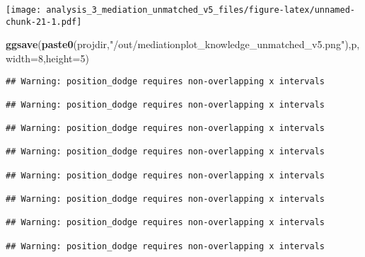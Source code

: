 \documentclass[
]{article}
\newenvironment{Shaded}{\begin{snugshade}}{\end{snugshade}}
\newcommand{\DataTypeTok}[1]{\textcolor[rgb]{0.13,0.29,0.53}{#1}}
\newcommand{\DecValTok}[1]{\textcolor[rgb]{0.00,0.00,0.81}{#1}}
\newcommand{\KeywordTok}[1]{\textcolor[rgb]{0.13,0.29,0.53}{\textbf{#1}}}
\newcommand{\NormalTok}[1]{#1}
\newcommand{\StringTok}[1]{\textcolor[rgb]{0.31,0.60,0.02}{#1}}
\begin{document}
\texttt{[image: analysis\_3\_mediation\_unmatched\_v5\_files/figure-latex/unnamed-chunk-21-1.pdf]}

\begin{Shaded}
\begin{Highlighting}[]
\KeywordTok{ggsave}\NormalTok{(}\KeywordTok{paste0}\NormalTok{(projdir,}\StringTok{"/out/mediationplot_knowledge_unmatched_v5.png"}\NormalTok{),p,}\DataTypeTok{width=}\DecValTok{8}\NormalTok{,}\DataTypeTok{height=}\DecValTok{5}\NormalTok{)}
\end{Highlighting}
\end{Shaded}

\begin{verbatim}
## Warning: position_dodge requires non-overlapping x intervals

## Warning: position_dodge requires non-overlapping x intervals

## Warning: position_dodge requires non-overlapping x intervals

## Warning: position_dodge requires non-overlapping x intervals

## Warning: position_dodge requires non-overlapping x intervals

## Warning: position_dodge requires non-overlapping x intervals

## Warning: position_dodge requires non-overlapping x intervals

## Warning: position_dodge requires non-overlapping x intervals
\end{verbatim}
\end{document}
